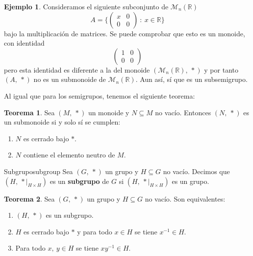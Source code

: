 \documentclass[a4paper]{book}
\theoremstyle{definition}
\newtheorem{theorem}{Teorema}[section]
\theoremstyle{ejemplo}
\newtheorem{ejem}{Ejemplo}[section]
\theoremstyle{demostracion}
\newcommand{\reales}{\mathbb{R}}
\newcommand{\realnmatrix}[1]{\mathcal{M}_{#1}(\reales)}
\begin{document}
\begin{ejem}
	Consideramos el siguiente subconjunto de $\realnmatrix{n}$
	\begin{equation*}
		A = \bigg\{ \left( \begin{array}{cc}
			x & 0 \\
			0 & 0
		\end{array} \right)\ :\ x \in \reales\bigg\}
	\end{equation*}
	bajo la multiplicación de matrices. Se puede comprobar que esto es un monoide, con identidad
	\begin{equation*}
		\left( \begin{array}{cc}
			1 & 0 \\
			0 & 0
		\end{array} \right)
	\end{equation*}
	pero esta identidad es diferente a la del monoide $(\realnmatrix{n},\ *)$ y por tanto $(A,\ *)$ no es un submonoide de $\realnmatrix{n}$. Aun así, sí que es un subsemigrupo.
\end{ejem}

Al igual que para los semigrupos, tenemos el siguiente teorema:

\begin{theorem}
	Sea $(M,\ *)$ un monoide y $N \subseteq M$ no vacío. Entonces $(N,\ *)$ es un submonoide si y solo sí se cumplen:
	\begin{enumerate}
		\item
		$N$ es cerrado bajo $*$.
		\item
		$N$ contiene el elemento neutro de $M$. 
	\end{enumerate}
\end{theorem}

\begin{define}{Subgrupo}{subgroup}
	Sea $(G,\ *)$ un grupo y $H \subseteq G$ no vacío. Decimos que $(H,\ *|_{H \times H})$ es un \textbf{subgrupo} de $G$ si $(H,\ *|_{H \times H})$ es un grupo.
\end{define}

\begin{theorem}
	Sea $(G,\ *)$ un grupo y $H \subseteq G$ no vacío. Son equivalentes:
	\begin{enumerate}
		\item
		$(H,\ *)$ es un subgrupo.
		\item
		$H$ es cerrado bajo $*$ y para todo $x \in H$ se tiene $x^{-1} \in H$.
		\item
		Para todo $x,\ y \in H$ se tiene $xy^{-1} \in H$.
	\end{enumerate}
\end{theorem}
\end{document}
